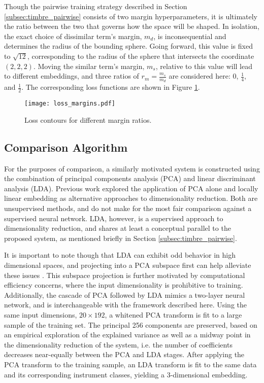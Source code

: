 Though the pairwise training strategy described in Section \ref{subsec:timbre_pairwise} consists of two margin hyperparameters, it is ultimately the ratio between the two that governs how the space will be shaped.
In isolation, the exact choice of dissimilar term's margin, $m_{d}$, is inconsequential and determines the radius of the bounding sphere.
Going forward, this value is fixed to $\sqrt{12}$, corresponding to the radius of the sphere that intersects the coordinate $(2, 2, 2)$.
Moving the similar term's margin, $m_{s}$, relative to this value will lead to different embeddings, and three ratios of $r_{m} = \frac{m_{s}}{m_{d}}$ are considered here: 0, $\frac{1}{4}$, and $\frac{1}{2}$.
The corresponding loss functions are shown in Figure \ref{fig:margins}.

\begin{figure}[h]
\centering
\texttt{[image: loss\_margins.pdf]}
\caption{Loss contours for different margin ratios.}
\label{fig:margins}
\end{figure}

\subsection{Comparison Algorithm}

For the purposes of comparison, a similarly motivated system is constructed using the combination of principal components analysis (PCA) and linear discriminant analysis (LDA).
Previous work explored the application of PCA alone and locally linear embedding as alternative approaches to dimensionality reduction.
Both are unsupervised methods, and do not make for the most fair comparison against a supervised neural network.
LDA, however, is a supervised approach to dimensionality reduction, and shares at least a conceptual parallel to the proposed system, as mentioned briefly in Section \ref{subsec:timbre_pairwise}.

It is important to note though that LDA can exhibit odd behavior in high dimensional spaces, and projecting into a PCA subspace first can help alleviate these issues \cite{Ji2008Generalized}.
This subspace projection is further motivated by computational efficiency concerns, where the input dimensionality is prohibitive to training.
Additionally, the cascade of PCA followed by LDA mimics a two-layer neural network, and is interchangeable with the framework described here.
Using the same input dimensions, $20\times192$, a whitened PCA transform is fit to a large sample of the training set.
The principal 256 components are preserved, based on an empirical exploration of the explained variance as well as a midway point in the dimensionality reduction of the system, i.e. the number of coefficients decreases near-equally between the PCA and LDA stages.
After applying the PCA transform to the training sample, an LDA transform is fit to the same data and its corresponding instrument classes, yielding a 3-dimensional embedding.



